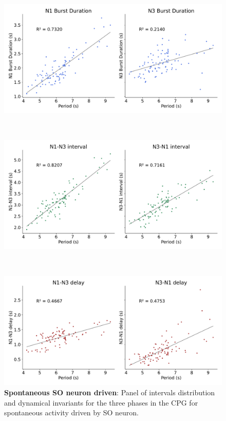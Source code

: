 \begin{figure}[htbp]
\begin{minipage}[b]{0.53\textwidth}
		\centering
		\begin{minipage}[b]{\textwidth}
			\centering
			\includegraphics[width=\textwidth]{./invariants/data/SUSSEX/prep4_so_driven_2/images/spontaneous_durations.pdf}
		\end{minipage}\\
		\begin{minipage}[b]{\textwidth}
			\centering
			\includegraphics[width=\textwidth]{./invariants/data/SUSSEX/prep4_so_driven_2/images/spontaneous_intervals.pdf}
		\end{minipage}\\
		\begin{minipage}[b]{\textwidth}
			\centering
			\includegraphics[width=\textwidth]{./invariants/data/SUSSEX/prep4_so_driven_2/images/spontaneous_delays.pdf}
		\end{minipage}
	\end{minipage}
	\caption{\textbf{Spontaneous SO neuron driven}: Panel of intervals distribution and dynamical invariants for the three phases in the CPG for spontaneous activity driven by SO neuron.}
	\label{fig:so spontaneous invariants}
\end{figure}

